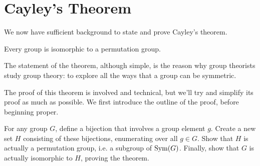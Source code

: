 \section{Cayley's Theorem}
We now have sufficient background to state and prove Cayley's theorem.

\begin{theorem}[Cayley]\label{thrm-cayley}
    Every group is isomorphic to a permutation group.
\end{theorem}

The statement of the theorem, although simple, is the reason why group theorists study group theory: to explore all the ways that a group can be symmetric.

The proof of this theorem is involved and technical, but we'll try and simplify its proof as much as possible. We first introduce the outline of the proof, before beginning proper.
\begin{proofsketch}
    For any group $G$, define a bijection that involves a group element $g$. Create a new set $H$ consisting of these bijections, enumerating over all $g \in G$. Show that $H$ is actually a permutation group, i.e. a subgroup of $\mathrm{Sym}(G)$. Finally, show that $G$ is actually isomorphic to $H$, proving the theorem.
\end{proofsketch}

